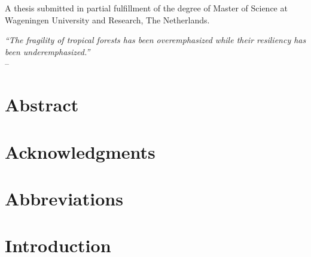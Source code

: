 \documentclass[11pt]{article}
\begin{document}


\newpage
\mbox{}
\newpage

\newpage
\vspace*{\fill}
\begin{center}
A thesis submitted in partial fulfillment of the degree of Master of Science
at Wageningen University and Research, The Netherlands.
\end{center}
\vspace*{0.5cm}

\newpage
\mbox{}
\newpage

\newpage
\vspace*{\fill}
\begin{center}
\emph{``The fragility of tropical forests has been overemphasized while their resiliency has been underemphasized.''} \\
-- \cite{lugo1995management}
\end{center}
\vspace*{\fill}

\newpage
\mbox{}
\newpage

\newpage
\section*{Abstract}


\newpage
\mbox{}
\newpage

\newpage
\section*{Acknowledgments}


\newpage
\mbox{}
\newpage

\newpage
\tableofcontents

\newpage
\mbox{}
\newpage


\renewcommand{\listfigurename}{List of figures}
\listoffigures

\newpage
\mbox{}
\newpage

\newpage
\section*{Abbreviations}



\newpage
\mbox{}
\newpage

\newpage
\section{Introduction}

\end{document}
